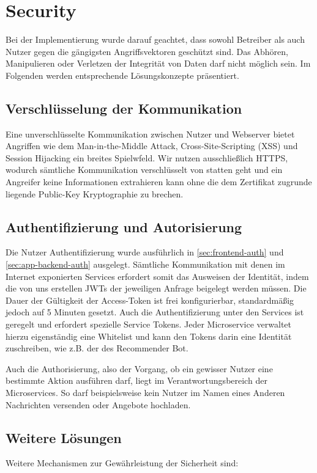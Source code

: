 \documentclass{article}
\begin{document}
\section{Security} %
Bei der Implementierung wurde darauf geachtet, dass sowohl Betreiber als auch Nutzer gegen die gängigsten Angriffsvektoren geschützt sind. Das Abhören, Manipulieren oder Verletzen der Integrität von Daten darf nicht möglich sein. Im Folgenden werden entsprechende Lösungskonzepte präsentiert.


\subsection{Verschlüsselung der Kommunikation}
Eine unverschlüsselte Kommunikation zwischen Nutzer und Webserver bietet Angriffen wie dem Man-in-the-Middle Attack, Cross-Site-Scripting (XSS) und Session Hijacking ein breites Spielwfeld. Wir nutzen ausschließlich HTTPS, wodurch sämtliche Kommunikation verschlüsselt von statten geht und ein Angreifer keine Informationen extrahieren kann ohne die dem Zertifikat zugrunde liegende Public-Key Kryptographie zu brechen.


\subsection{Authentifizierung und Autorisierung}
\label{sec:authentication}

Die Nutzer Authentifizierung wurde ausführlich in \autoref{sec:frontend-auth} und \autoref{sec:app-backend-auth} ausgelegt. Sämtliche Kommunikation mit denen im Internet exponierten Services erfordert somit das Ausweisen der Identität, indem die von uns erstellen JWTs der jeweiligen Anfrage beigelegt werden müssen. Die Dauer der Gültigkeit der Access-Token ist frei konfigurierbar, standardmäßig jedoch auf 5 Minuten gesetzt. Auch die Authentifizierung unter den Services ist geregelt und erfordert spezielle Service Tokens. Jeder Microservice verwaltet hierzu eigenständig eine Whitelist und kann den Tokens darin eine Identität zuschreiben, wie z.B. der des Recommender Bot. 

Auch die Authorisierung, also der Vorgang, ob ein gewisser Nutzer eine bestimmte Aktion ausführen darf, liegt im Verantwortungsbereich der Microservices. So darf beispielsweise kein Nutzer im Namen eines Anderen Nachrichten versenden oder Angebote hochladen.


\subsection{Weitere Lösungen}
Weitere Mechanismen zur Gewährleistung der Sicherheit sind:
\end{document}
